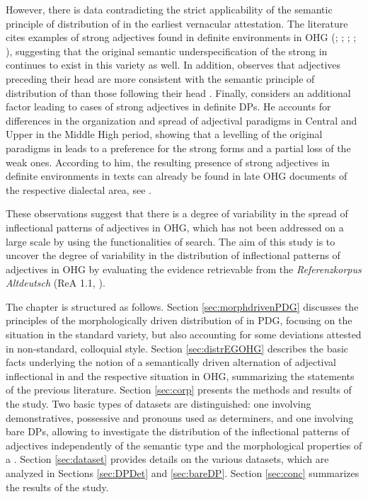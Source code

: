 \documentclass[output=paper,colorlinks,citecolor=brown]{langscibook}
\begin{document}
However, there is data contradicting the strict applicability of the semantic principle of distribution of  in the earliest vernacular attestation. The literature cites examples of strong adjectives found in definite environments in OHG (\cite[750]{Wilmanns09}; \cite[185]{behaghel1923deutsche}; \cite[68--69]{Heinrichs54}; \cite[68--70]{Dal14}; \cite[298]{Braune2018AHD}), suggesting that the original semantic underspecification of the strong  in  continues to exist in this variety as well. In addition, \citet[70]{Demske01} observes that adjectives preceding their head  are more consistent with the semantic principle of distribution of  than those following their head . Finally, \citet{klein2007semantischen} considers an additional factor leading to cases of strong adjectives in definite DPs. He accounts for differences in the organization and spread of adjectival paradigms in Central and Upper  in the Middle High  period, showing that a levelling of the original paradigms in  leads to a preference for the strong forms and a partial loss of the weak ones. According to him, the resulting presence of strong adjectives in definite environments in  texts can already be found in late OHG documents of the respective dialectal area, see \citet[200]{klein2007semantischen}.

These observations suggest that there is a degree of variability in the spread of inflectional patterns of adjectives in OHG, which has not been addressed on a large scale by using the functionalities of  search. The aim of this study is to uncover the degree of variability in the distribution of inflectional patterns of adjectives in OHG by evaluating the evidence retrievable from the \textit{Referenzkorpus Altdeutsch} (ReA 1.1, \cite{RefKorpAltD}).

The chapter is structured as follows. Section \ref{sec:morphdrivenPDG} discusses the principles of the morphologically driven distribution of  in PDG, focusing on the situation in the standard variety, but also accounting for some deviations attested in non-standard, colloquial style. Section \ref{sec:distrEGOHG} describes the basic facts underlying the notion of a semantically driven alternation of adjectival inflectional in  and the respective situation in OHG, summarizing the statements of the previous literature. Section \ref{sec:corp} presents the methods and results of the  study. Two basic types of datasets are distinguished: one involving demonstratives, possessive and  pronouns used as determiners, and one involving bare DPs, allowing to investigate the distribution of the inflectional patterns of adjectives independently of the semantic type and the morphological properties of a . Section \ref{sec:dataset} provides details on the various datasets, which are analyzed in Sections \ref{sec:DPDet} and \ref{sec:bareDP}. Section \ref{sec:conc} summarizes the results of the  study.
\end{document}
